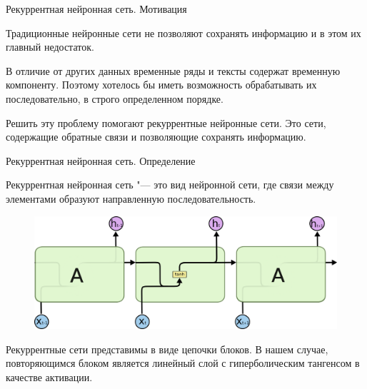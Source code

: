 \documentclass[notheorems, handout, 10pt]{beamer}
\begin{document}
	\begin{frame}{Рекуррентная нейронная сеть. Мотивация}
		
		Традиционные нейронные сети не позволяют сохранять информацию и в этом их главный недостаток. 
		
		\vspace{0.5cm}
		
		В отличие от других данных временные ряды и тексты содержат временную компоненту. Поэтому хотелось бы иметь возможность обрабатывать их последовательно, в строго определенном порядке.
		
		\vspace{0.5cm}
		
		Решить эту проблему помогают рекуррентные нейронные сети. Это сети, содержащие обратные связи и позволяющие сохранять информацию.
		
		\note{}
		
	\end{frame}
	
	\begin{frame}{Рекуррентная нейронная сеть. Определение}
		
		Рекуррентная нейронная сеть "--- это вид нейронной сети, где связи между элементами образуют направленную последовательность.
		
		\begin{figure}[H]
			\includegraphics[width=1\linewidth]{images/5}
		\end{figure}
		
		Рекуррентные сети представимы в виде цепочки блоков. В нашем случае, повторяющимся блоком является линейный слой с гиперболическим тангенсом в качестве активации.
		
		\note{}
		
	\end{frame}
	
\end{document}

